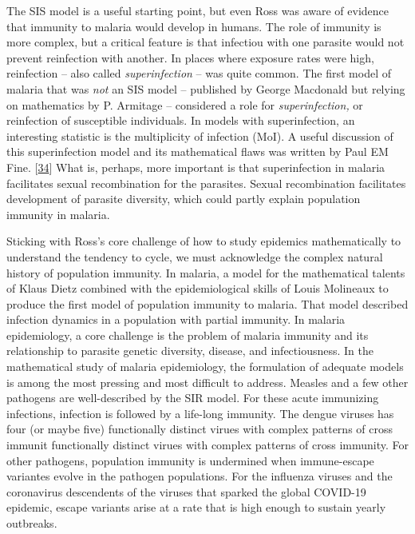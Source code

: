 \documentclass[
]{book}
\begin{document}
The SIS model is a useful starting point, but even Ross was aware of evidence that immunity to malaria would develop in humans.
The role of immunity is more complex, but a critical feature is that infectiou with one parasite would not prevent reinfection with another.
In places where exposure rates were high, reinfection -- also called \emph{superinfection} -- was quite common.
The first model of malaria that was \emph{not} an SIS model -- published by George Macdonald but relying on mathematics by P. Armitage --
considered a role for \emph{superinfection,} or reinfection of susceptible individuals.
In models with superinfection, an interesting statistic is the multiplicity of infection (MoI).
A useful discussion of this superinfection model and its mathematical flaws was written by Paul EM Fine. {[}\protect\hyperlink{ref-FinePEM1975SuperinfectionProblem}{34}{]}
What is, perhaps, more important is that superinfection in malaria facilitates sexual recombination for the parasites.
Sexual recombination facilitates development of parasite diversity, which could partly explain population immunity in malaria.

Sticking with Ross's core challenge of how to study epidemics mathematically to understand the tendency to cycle, we must acknowledge
the complex natural history of population immunity. In malaria,
a model for the mathematical talents of Klaus Dietz combined with the epidemiological skills of Louis Molineaux to produce the first model of population immunity to malaria.
That model described infection dynamics in a population with partial immunity.
In malaria epidemiology, a core challenge is the problem of malaria immunity and its relationship to parasite genetic diversity, disease, and infectiousness.
In the mathematical study of malaria epidemiology, the formulation of adequate models is among the most pressing and most difficult to address.
Measles and a few other pathogens are well-described by the SIR model.
For these acute immunizing infections, infection is followed by a life-long immunity.
The dengue viruses has four (or maybe five) functionally distinct virues with complex patterns of cross immunit functionally distinct virues with complex patterns of cross immunity.
For other pathogens, population immunity is undermined when immune-escape variantes evolve in the pathogen populations.
For the influenza viruses and the coronavirus descendents of the viruses that sparked the global COVID-19 epidemic, escape variants arise at a rate that is high enough to sustain yearly outbreaks.
\end{document}
